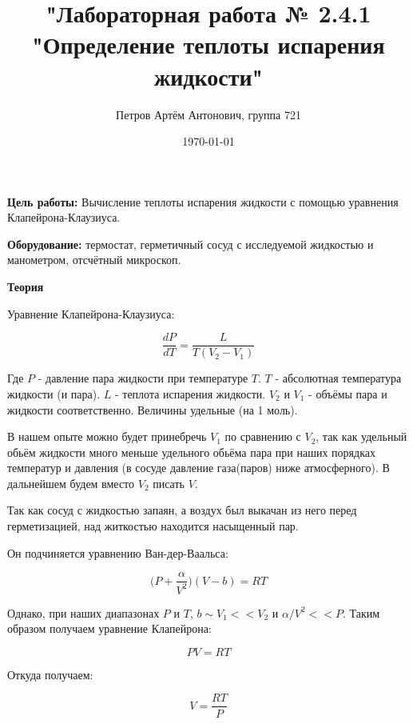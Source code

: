 \documentclass[a4paper,12pt]{article}
\author{Петров Артём Антонович, группа 721}
\title{"Лабораторная работа № 2.4.1 "Определение теплоты испарения жидкости"}
\date{\today}
\begin{document}

\begin{minipage}[t][8cm]{\textwidth}
\maketitle
\end{minipage}


\textbf{Цель работы:} Вычисление теплоты испарения жидкости с помощью уравнения Клапейрона-Клаузиуса.
\bigskip

\textbf{Оборудование:} термостат, герметичный сосуд с исследуемой жидкостью и манометром, отсчётный микроскоп.
\bigskip

\textbf{Теория}
\bigskip

Уравнение Клапейрона-Клаузиуса:

\begin{equation}\label{eq:klap-klauz}
\frac{dP}{dT} = \frac{L}{T (V_2 - V_1)}
\end{equation}

Где $P$ - давление пара жидкости при температуре $T$. $T$ - абсолютная температура жидкости (и пара). $L$ - теплота испарения жидкости. $V_2$ и $V_1$ - объёмы пара и жидкости соответственно. Величины удельные (на 1 моль).

В нашем опыте можно будет принебречь $V_1$ по сравнению с $V_2$, так как удельный обьём жидкости много меньше удельного обьёма пара при наших порядках температур и давления (в сосуде давление газа(паров) ниже атмосферного). В дальнейшем будем вместо $V_2$ писать $V$.

Так как сосуд с жидкостью запаян, а воздух был выкачан из него перед герметизацией, над житкостью находится насыщенный пар.

Он подчиняется уравнению Ван-дер-Ваальса:

\begin{equation}\label{eq:real-gas}
\bigg(P + \frac{\alpha}{V^2}\bigg)(V-b) = RT
\end{equation}
 
 Однако, при наших диапазонах $P$ и $T$, $b \sim V_1 << V_2$ и $\alpha/V^2 << P$. Таким образом получаем уравнение Клапейрона:
 
\begin{equation}\label{eq:ideal-gas}
PV = RT
\end{equation}

Откуда получаем:

\begin{equation}\label{eq:ideal-gas2}
V = \frac{RT}{P}
\end{equation}
 
\end{document}
